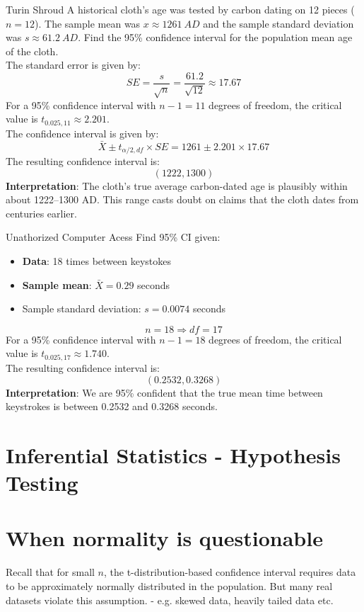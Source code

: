 \documentclass[9pt]{extarticle}
\begin{document}
\begin{examplebox}{Turin Shroud}{}
    A historical cloth's age was tested by carbon dating on 12 pieces ($n = 12$). The sample mean was $x \approx 1261 \ AD$ and the sample standard deviation was $s \approx 61.2 \ AD$. Find the 95\% confidence interval for the population mean age of the cloth. \\[2ex]
    The standard error is given by:
    $$SE = \frac{s}{\sqrt{n}} = \frac{61.2}{\sqrt{12}} \approx 17.67$$
    For a 95\% confidence interval with $n-1 = 11$ degrees of freedom, the critical value is $t_{0.025, 11} \approx 2.201$.\\
    The confidence interval is given by:
    $$\bar{X} \pm t_{\alpha/2, df} \times SE = 1261 \pm 2.201 \times 17.67$$
    The resulting confidence interval is:
    $$(1222, 1300)$$
    \textbf{Interpretation}: The cloth’s true average carbon-dated age is plausibly within about 1222–1300 AD. This range casts doubt on claims that the cloth dates from centuries earlier.
\end{examplebox}
\begin{examplebox}{Unathorized Computer Acess}{}
    Find 95\% CI given:
    \begin{itemize}
        \item \textbf{Data}: 18 times between keystokes 
        \item \textbf{Sample mean}: $\bar{X} = 0.29$ seconds
        \item Sample standard deviation: $s = 0.0074$ seconds
    \end{itemize}
    $$n  = 18 \Rightarrow df = 17$$
    For a 95\% confidence interval with $n-1 = 18$ degrees of freedom, the critical value is $t_{0.025, 17} \approx 1.740$.\\
    The resulting confidence interval is:
    $$(0.2532, 0.3268)$$
    \textbf{Interpretation}: We are 95\% confident that the true mean time between keystrokes is between 0.2532 and 0.3268 seconds.
\end{examplebox}

\section{Inferential Statistics - Hypothesis Testing}
\section{When normality is questionable}
Recall that for small $n$, the t-distribution-based confidence interval requires data to be approximately normally distributed in the population. But many real datasets violate this assumption. - e.g. skewed data, heavily tailed data etc.
\end{document}
